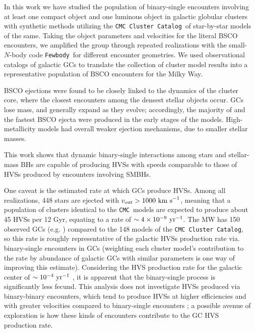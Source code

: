 \documentclass[twocolumn]{aastex631}
\newcommand{\CMC}{\texttt{CMC}}
\newcommand{\CMCcat}{\texttt{CMC Cluster Catalog}}
\newcommand{\fewbody}{\texttt{Fewbody}}
\begin{document}
In this work we have studied the population of binary-single encounters involving at least one compact object and one luminous object in galactic globular clusters with synthetic methods utilizing the \CMCcat\ of star-by-star models of the same.
Taking the object parameters and velocities for the literal BSCO encounters, we amplified the group through repeated realizations with the small-$N$-body code \fewbody\ for different encounter geometries.
We used observational catalogs of galactic GCs to translate the collection of cluster model results into a representative population of BSCO encounters for the Milky Way.

BSCO ejections were found to be closely linked to the dynamics of the cluster core, where the closest encounters among the densest stellar objects occur.
GCs lose mass, and generally expand as they evolve; accordingly, the majority of and the fastest BSCO ejecta were produced in the early stages of the models.
High-metallicity models had overall weaker ejection mechanisms, due to smaller stellar masses.


This work shows that dynamic binary-single interactions among stars and stellar-mass BHs are capable of producing HVSs with speeds comparable to those of HVSs produced by encounters involving SMBHs.

One caveat is the estimated rate at which GCs produce HVSs.
Among all realizations, 448 stars are ejected with $v_{\rm out}>1000~{\rm km~s}^{-1}$, meaning that a population of clusters identical to the \CMC\ models are expected to produce about 45 HVSs per 12 Gyr, equating to a rate of $\sim 4 \times 10^{-9}~{\rm yr}^{-1}$.
The MW has 150 observed GCs (e.g. \citealt{2018MNRAS.478.1520B}) compared to the 148 models of the \CMCcat, so this rate is roughly representative of the galactic HVSs production rate via. binary-single encounters in GCs (weighting each cluster model's contribution to the rate by abundance of galactic GCs with similar parameters is one way of improving this estimate).
Considering the HVS production rate for the galactic center of $\sim 10^{-4}~{\rm yr}^{-1}$ \citep{2015ARA&A..53...15B}, it is apparent that the binary-single process is significantly less fecund.
This analysis does not investigate HVSs produced via binary-binary encounters, which tend to produce HVSs at higher efficiencies and with greater velocities compared to binary-single encounters \citep{1991AJ....101..562L}; a possible avenue of exploration is how these kinds of encounters contribute to the GC HVS production rate.
\end{document}
